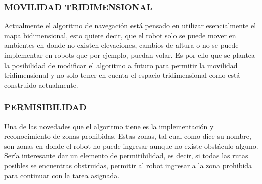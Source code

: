 \subsubsection{MOVILIDAD TRIDIMENSIONAL}
Actualmente el algoritmo de navegación está pensado en utilizar esencialmente el mapa bidimensional, esto quiere decir, que el robot solo se puede mover en ambientes en donde no existen elevaciones, cambios de altura o no se puede implementar en robots que por ejemplo, puedan volar. Es por ello que se plantea la posibilidad de modificar el algoritmo a futuro para permitir la movilidad tridimensional y no solo tener en cuenta el espacio tridimensional como está construido actualmente.

\subsubsection{PERMISIBILIDAD}
Una de las novedades que el algoritmo tiene es la implementación y reconocimiento de zonas prohibidas. Estas zonas, tal cual como dice su nombre, son zonas en donde el robot no puede ingresar aunque no existe obstáculo alguno. Sería interesante dar un elemento de permitibilidad, es decir, si todas las rutas posibles se encuentras obstruidas, permitir al robot ingresar a la zona prohibida para continuar con la tarea asignada.
